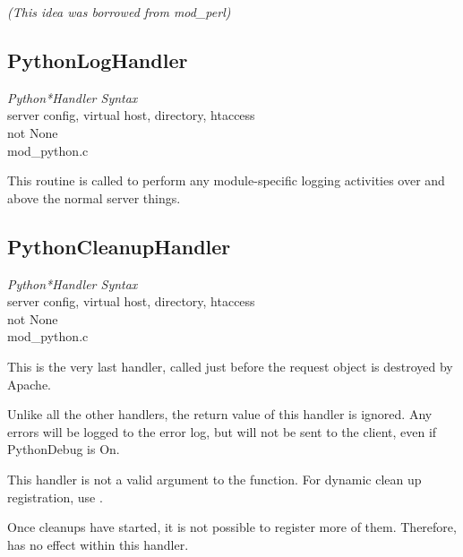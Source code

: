 \emph{(This idea was borrowed from mod_perl)}

\subsection{PythonLogHandler\label{dir-handlers-plh}}

\emph{Python*Handler Syntax}\\
server config, virtual host, directory, htaccess\\
not None\\
mod_python.c

This routine is called to perform any module-specific logging
activities over and above the normal server things.

\subsection{PythonCleanupHandler\label{dir-handlers-pch}}

\emph{Python*Handler Syntax}\\
server config, virtual host, directory, htaccess\\
not None\\
mod_python.c

This is the very last handler, called just before the request object
is destroyed by Apache.

Unlike all the other handlers, the return value of this handler is
ignored. Any errors will be logged to the error log, but will not be
sent to the client, even if PythonDebug is On.

This handler is not a valid argument to the 
function. For dynamic clean up registration, use
.

Once cleanups have started, it is not possible to register more of
them. Therefore,  has no effect within this
handler.

